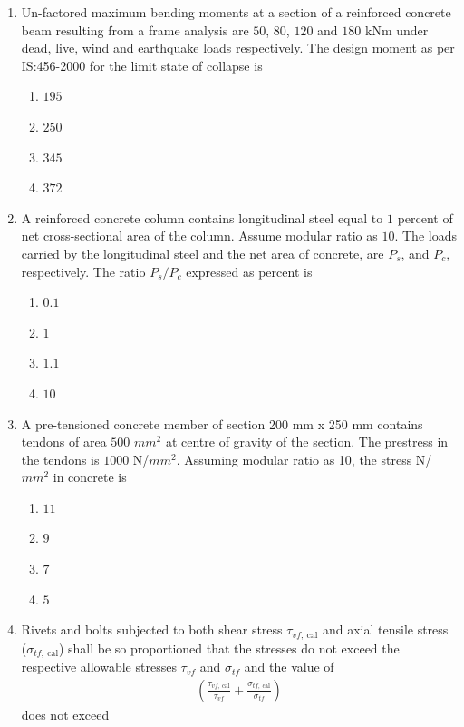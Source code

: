 \documentclass[journal]{IEEEtran}
\begin{document}
\begin{enumerate}
\item Un-factored maximum bending moments at a section of a reinforced concrete beam resulting from
a frame analysis are $50$, $80$, $120$ and $180$ kNm under dead, live, wind and earthquake loads
respectively. The design moment  as per IS:456-2000 for the limit state of collapse 
is \textbf{}

\begin{enumerate}
\item $195$
\item $250$
\item $345$
\item $372$
\end{enumerate}

\item A reinforced concrete column contains longitudinal steel equal to $1$ percent of net cross-sectional area of the column. Assume modular ratio as $10$. The loads carried  by the longitudinal steel and the net area of concrete, are $P_s$, and $P_c$, respectively. The ratio $P_s/P_c$ expressed
as percent is \textbf{}

\begin{enumerate}
\item $0.1$
\item $1$
\item $1.1$
\item $10$
\end{enumerate}

\item A pre-tensioned concrete member of section 200 mm x 250 mm contains tendons of area $500$ $mm^{2}$
at centre of gravity of the section. The prestress in the tendons is $1000$ N/$mm^{2}$. Assuming modular
ratio as 10, the stress N/$mm^{2}$ in concrete is \textbf{}

\begin{enumerate}
\item $11$
\item $9$
\item $7$
\item $5$
\end{enumerate}

\item Rivets and bolts subjected to both shear stress $\tau_{vf,\ \text{cal}}$ and axial tensile stress ($\sigma_{tf,\ \text{cal}}$) shall be so proportioned that the stresses do not exceed the respective allowable stresses $\tau_{vf}$ and $\sigma_{tf}$ and the value of
\begin{align}
\left( \frac{\tau_{vf,\ \text{cal}}}{\tau_{vf}} + \frac{\sigma_{tf,\ \text{cal}}}{\sigma_{tf}} \right)
\end{align}
does not exceed \textbf{}


\end{enumerate}
\end{document}

